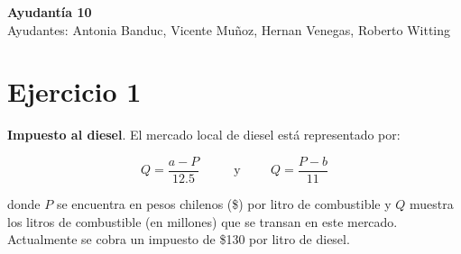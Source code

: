 \documentclass[11pt,letterpaper]{article}
\begin{document}
\begin{center}
    \textbf{\Large{Ayudantía 10}}\\
    Ayudantes: Antonia Banduc, Vicente Muñoz, Hernan Venegas, Roberto Witting
\end{center}



\section*{Ejercicio 1}
\noindent \textbf{Impuesto al diesel}. El mercado local de diesel está representado por:

$$Q = \frac{a-P}{12.5}  \hspace{1cm} \text{ y}   \hspace{1cm}   Q = \frac{P-b}{11}$$

\noindent donde $P$ se encuentra en pesos chilenos (\$) por litro de combustible y $Q$ muestra los litros de combustible (en millones) que se transan en este mercado. Actualmente se cobra un impuesto de \$130 por litro de diesel.
\end{document}
